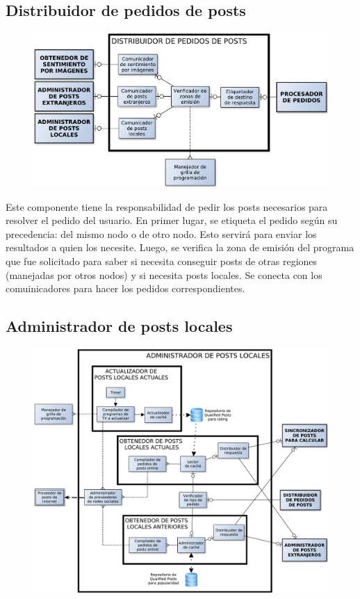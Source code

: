 \subsection{Distribuidor de pedidos de posts}

\begin{figure}[H]
\centering
\includegraphics[width=\textwidth]{graph/distribuidor.pdf}
\end{figure}

Este componente tiene la responsabilidad de pedir los posts necesarios para resolver el pedido del usuario. En primer lugar, se etiqueta el pedido según su precedencia: del mismo nodo o de otro nodo. Esto servirá para enviar los resultados a quien los necesite. Luego, se verifica la zona de emisión del programa que fue solicitado para saber si necesita conseguir posts de otras regiones (manejadas por otros nodos) y si necesita posts locales. Se conecta con los comuinicadores para hacer los pedidos correspondientes.

\subsection{Administrador de posts locales}

\begin{figure}[H]
\centering
\includegraphics[width=\textwidth]{graph/adminlocal.pdf}
\end{figure}

